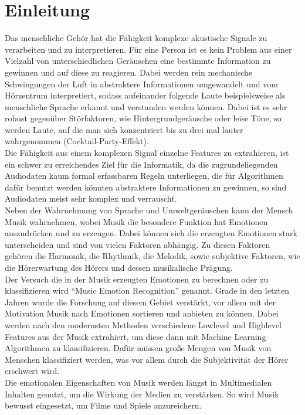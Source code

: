 \documentclass[11pt,a4paper]{article}
\begin{document}
\tableofcontents
\newpage


\section{Einleitung}
Das menschliche Gehör hat die Fähigkeit komplexe akustische Signale zu verarbeiten und zu interpretieren. Für eine Person ist es kein Problem aus einer Vielzahl von unterschiedlichen Geräuschen eine bestimmte Information zu gewinnen und auf diese zu reagieren. Dabei werden rein mechanische Schwingungen der Luft in abstraktere Informationen umgewandelt und vom Hörzentrum interpretiert, sodass aufeinander folgende Laute beispielsweise als menschliche Sprache erkannt und verstanden werden können. Dabei ist es sehr robust gegenüber Störfaktoren, wie Hintergrundgeräusche oder leise Töne, so werden Laute, auf die man sich konzentriert bis zu drei mal lauter wahrgenommen (Cocktail-Party-Effekt).\\
Die Fähigkeit aus einem komplexen Signal einzelne Features zu extrahieren, ist ein schwer zu erreichendes Ziel für die Informatik, da die zugrundeliegenden Audiodaten kaum formal erfassbaren Regeln unterliegen, die für Algorithmen dafür benutzt werden könnten abstraktere Informationen zu gewinnen, so sind Audiodaten meist sehr komplex und verrauscht.\\
Neben der Wahrnehmung von Sprache und Umweltgeräuschen kann der Mensch Musik wahrnehmen, wobei Musik die besondere Funktion hat Emotionen auszudrücken und zu erzeugen. Dabei können sich die erzeugten Emotionen stark unterscheiden und sind von vielen Faktoren abhängig. Zu diesen Faktoren gehören die Harmonik, die Rhythmik, die Melodik, sowie subjektive Faktoren, wie die Hörerwartung des Hörers und dessen musikalische Prägung.\\
Der Versuch die in der Musik erzeugten Emotionen zu berechnen oder zu klassifizieren wird ``Music Emotion Recognition'' genannt. Grade in den letzten Jahren wurde die Forschung auf diesem Gebiet verstärkt, vor allem mit der Motivation Musik nach Emotionen sortieren und anbieten zu können. Dabei werden nach den modernsten Methoden verschiedene Lowlevel und Highlevel Features aus der Musik extrahiert, um diese dann mit Machine Learning Algorithmen zu klassifizieren. Dafür müssen große Mengen von Musik von Menschen klassifiziert werden, was vor allem durch die Subjektivität der Hörer erschwert wird.\\
Die emotionalen Eigenschaften von Musik werden längst in Multimedialen Inhalten genutzt, um die Wirkung der Medien zu verstärken. So wird Musik bewusst eingesetzt, um Filme und Spiele anzureichern.\\
\end{document}
